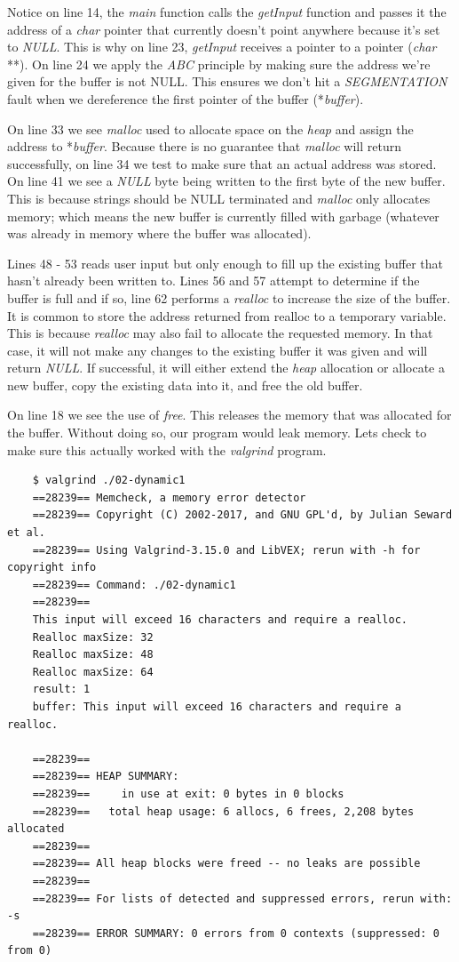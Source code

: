 \documentclass[../main.tex]{subfiles}
\begin{document}
	Notice on line 14, the \textit{main} function calls the \textit{getInput} function and passes it the address of a \textit{char} pointer that currently doesn't point anywhere because it's set to \textit{NULL}.  This is why on line 23, \textit{getInput} receives a pointer to a pointer (\textit{char} **).  On line 24 we apply the \textit{ABC} principle by making sure the address we're given for the buffer is not NULL.  This ensures we don't hit a \textit{SEGMENTATION} fault when we dereference the first pointer  of the buffer (*\textit{buffer}). 
	
	On line 33 we see \textit{malloc} used to allocate space on the \textit{heap} and assign the address to *\textit{buffer}.  Because there is no guarantee that \textit{malloc} will return successfully, on line 34 we test to make sure that an actual address was stored.  On line 41 we see a \textit{NULL} byte being written to the first byte of the new buffer.  This is because strings should be NULL terminated and \textit{malloc} only allocates memory; which means the new buffer is currently filled with garbage (whatever was already in memory where the buffer was allocated).
	
	Lines 48 - 53 reads user input but only enough to fill up the existing buffer that hasn't already been written to.  Lines 56 and 57 attempt to determine if the buffer is full and if so, line 62 performs a \textit{realloc} to increase the size of the buffer.  It is common to store the address returned from realloc to a temporary variable.  This is because \textit{realloc} may also fail to allocate the requested memory.  In that case, it will not make any changes to the existing buffer it was given and will return \textit{NULL}.  If successful, it will either extend the \textit{heap} allocation or allocate a new buffer, copy the existing data into it, and free the old buffer.  
	
	On line 18 we see the use of \textit{free}.  This releases the memory that was allocated for the buffer.  Without doing so, our program would leak memory.  Lets check to make sure this actually worked with the \textit{valgrind} program.
	
	\begin{verbatim}
	$ valgrind ./02-dynamic1 
	==28239== Memcheck, a memory error detector
	==28239== Copyright (C) 2002-2017, and GNU GPL'd, by Julian Seward et al.
	==28239== Using Valgrind-3.15.0 and LibVEX; rerun with -h for copyright info
	==28239== Command: ./02-dynamic1
	==28239== 
	This input will exceed 16 characters and require a realloc.
	Realloc maxSize: 32
	Realloc maxSize: 48
	Realloc maxSize: 64
	result: 1
	buffer: This input will exceed 16 characters and require a realloc.
	
	==28239== 
	==28239== HEAP SUMMARY:
	==28239==     in use at exit: 0 bytes in 0 blocks
	==28239==   total heap usage: 6 allocs, 6 frees, 2,208 bytes allocated
	==28239== 
	==28239== All heap blocks were freed -- no leaks are possible
	==28239== 
	==28239== For lists of detected and suppressed errors, rerun with: -s
	==28239== ERROR SUMMARY: 0 errors from 0 contexts (suppressed: 0 from 0)
	\end{verbatim}
	
\end{document}

